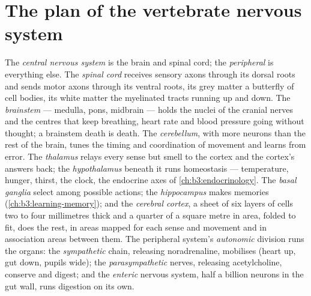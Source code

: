\section{The plan of the vertebrate nervous system}

\begin{definition}\label{def:b3:nervous-systems:plan}
The \emph{central nervous system} is the brain and spinal cord; the
\emph{peripheral} is everything else. The \emph{spinal cord} receives
sensory axons through its dorsal roots and sends motor axons through
its ventral roots, its grey matter a butterfly of cell bodies, its
white matter the myelinated tracts running up and down. The
\emph{brainstem} --- medulla, pons, midbrain --- holds the nuclei of
the cranial nerves and the centres that keep breathing, heart rate and
blood pressure going without thought; a brainstem death is death. The
\emph{cerebellum}, with more neurons than the rest of the brain, tunes
the timing and coordination of movement and learns from error. The
\emph{thalamus} relays every sense but smell to the cortex and the
cortex's answers back; the \emph{hypothalamus} beneath it runs
homeostasis --- temperature, hunger, thirst, the clock, the endocrine
axes of \cref{ch:b3:endocrinology}. The \emph{basal ganglia} select
among possible actions; the \emph{hippocampus} makes memories
(\cref{ch:b3:learning-memory}); and the \emph{cerebral cortex}, a sheet
of six layers of cells two to four millimetres thick and a quarter of a
square metre in area, folded to fit, does the rest, in areas mapped for
each sense and movement and in association areas between them. The
peripheral system's \emph{autonomic} division runs the organs: the
\emph{sympathetic} chain, releasing noradrenaline, mobilises (heart up,
gut down, pupils wide); the \emph{parasympathetic} nerves, releasing
acetylcholine, conserve and digest; and the \emph{enteric} nervous
system, half a billion neurons in the gut wall, runs digestion on its
own.
\end{definition}

